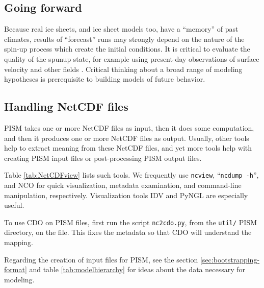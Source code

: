 \subsection{Going forward}  \label{subsect:forecastcaution}  Because real ice sheets, and ice sheet models too, have a ``memory'' of past climates, results of ``forecast'' runs may strongly depend on the nature of the spin-up process which create the initial conditions.  It is critical to evaluate the quality of the spunup state, for example using present-day observations of surface velocity and other fields \cite{AschwandenAdalgeirsdottirKhroulev}.  Critical thinking about a broad range of modeling hypotheses is prerequisite to building models of future behavior.


\subsection{Handling NetCDF files}\label{subsect:nctoolsintro}  PISM takes one or more NetCDF files as input, then it does some computation, and then it produces one or more NetCDF files as output.  Usually, other tools help to extract meaning from these NetCDF files, and yet more tools help with creating PISM input files or post-processing PISM output files.

Table \ref{tab:NetCDFview} lists such tools.  We frequently use \texttt{ncview}, ``\texttt{ncdump -h}'', and NCO for quick visualization, metadata examination, and command-line manipulation, respectively.  Visualization tools IDV and PyNGL are especially useful.  

To use CDO on PISM files, first run the script \texttt{nc2cdo.py}, from the \texttt{util/} PISM directory, on the file.  This fixes the metadata so that CDO will understand the mapping.

Regarding the creation of input files for PISM, see the section \ref{sec:bootstrapping-format} and table \ref{tab:modelhierarchy} for ideas about the data necessary for modeling.

